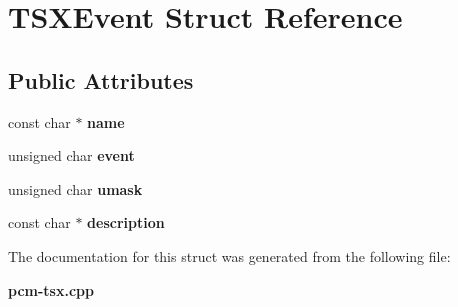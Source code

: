 \section{T\+S\+X\+Event Struct Reference}
\label{structTSXEvent}
\subsection*{Public Attributes}
\begin{DoxyCompactItemize}
\item 
\mbox{\label{structTSXEvent_a592441448f28d73655c864f5dbb77538}} 
const char $\ast$ {\bfseries name}
\item 
\mbox{\label{structTSXEvent_a45969e694e699c485379594701bd7e35}} 
unsigned char {\bfseries event}
\item 
\mbox{\label{structTSXEvent_a2f1b2f588a4641abde0dd5bd7870a537}} 
unsigned char {\bfseries umask}
\item 
\mbox{\label{structTSXEvent_aae0d6de90f1596c51b6c0345356a1076}} 
const char $\ast$ {\bfseries description}
\end{DoxyCompactItemize}


The documentation for this struct was generated from the following file\+:\begin{DoxyCompactItemize}
\item 
\textbf{ pcm-\/tsx.\+cpp}\end{DoxyCompactItemize}
